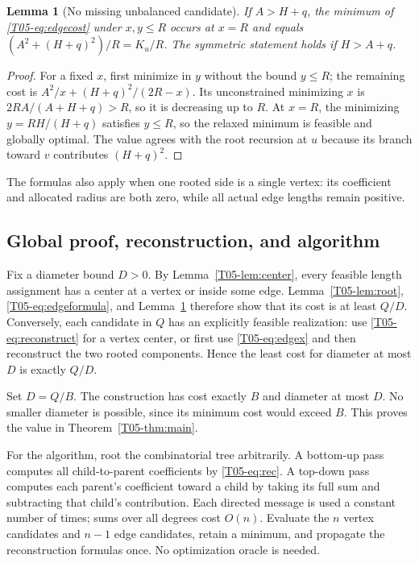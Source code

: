 \documentclass[11pt,a4paper]{article}
\newtheorem{lemma}[theorem]{Lemma}
\theoremstyle{definition}\newtheorem{definition}[theorem]{Definition}
\theoremstyle{remark}\newtheorem{remark}[theorem]{Remark}
\numberwithin{equation}{section}
\begin{document}
\begin{lemma}[No missing unbalanced candidate]\label{T05-lem:unbalanced}
If $A>H+q$, the minimum of \eqref{T05-eq:edgecost} under $x,y\le R$ occurs at $x=R$ and equals $(A^2+(H+q)^2)/R=K_u/R$. The symmetric statement holds if $H>A+q$.
\end{lemma}
\begin{proof}
For a fixed $x$, first minimize in $y$ without the bound $y\le R$; the remaining cost is
$A^2/x+(H+q)^2/(2R-x)$. Its unconstrained minimizing $x$ is $2RA/(A+H+q)>R$, so it is decreasing up to $R$. At $x=R$, the minimizing $y=RH/(H+q)$ satisfies $y\le R$, so the relaxed minimum is feasible and globally optimal. The value agrees with the root recursion at $u$ because its branch toward $v$ contributes $(H+q)^2$.
\end{proof}
The formulas also apply when one rooted side is a single vertex: its coefficient and allocated radius are both zero, while all actual edge lengths remain positive.

\subsection{Global proof, reconstruction, and algorithm}\label{T05-sec-4}
Fix a diameter bound $D>0$. By Lemma~\ref{T05-lem:center}, every feasible length assignment has a center at a vertex or inside some edge. Lemma~\ref{T05-lem:root}, \eqref{T05-eq:edgeformula}, and Lemma~\ref{T05-lem:unbalanced} therefore show that its cost is at least $Q/D$. Conversely, each candidate in $Q$ has an explicitly feasible realization: use \eqref{T05-eq:reconstruct} for a vertex center, or first use \eqref{T05-eq:edgex} and then reconstruct the two rooted components. Hence the least cost for diameter at most $D$ is exactly $Q/D$.

Set $D=Q/B$. The construction has cost exactly $B$ and diameter at most $D$. No smaller diameter is possible, since its minimum cost would exceed $B$. This proves the value in Theorem~\ref{T05-thm:main}.

For the algorithm, root the combinatorial tree arbitrarily. A bottom-up pass computes all child-to-parent coefficients by \eqref{T05-eq:rec}. A top-down pass computes each parent's coefficient toward a child by taking its full sum and subtracting that child's contribution. Each directed message is used a constant number of times; sums over all degrees cost $O(n)$. Evaluate the $n$ vertex candidates and $n-1$ edge candidates, retain a minimum, and propagate the reconstruction formulas once. No optimization oracle is needed.
\end{document}

